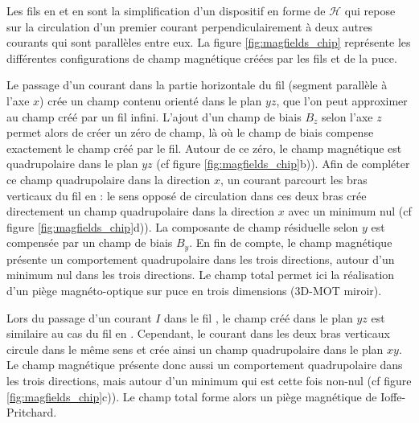 Les fils en  et en  sont la simplification d'un dispositif en forme de $\mathcal{H}$ qui repose sur la circulation d'un premier courant perpendiculairement à deux autres courants qui sont parallèles entre eux.
La figure \eqref{fig:magfields_chip} représente les différentes configurations de champ magnétique créées par les fils  et  de la puce.

Le passage d'un courant dans la partie horizontale du fil (segment parallèle à l'axe $x$) crée un champ contenu orienté dans le plan $yz$, que l'on peut approximer au champ créé par un fil infini.
L'ajout d'un champ de biais $B_z$ selon l'axe $z$ permet alors de créer un zéro de champ, là où le champ de biais compense exactement le champ créé par le fil.
Autour de ce zéro, le champ magnétique est quadrupolaire dans le plan $yz$ (cf figure \ref{fig:magfields_chip}b)).
Afin de compléter ce champ quadrupolaire dans la direction $x$, un courant parcourt les bras verticaux du fil en  : le sens opposé de circulation dans ces deux bras crée directement un champ quadrupolaire dans la direction $x$ avec un minimum nul (cf figure \ref{fig:magfields_chip}d)).
La composante de champ résiduelle selon $y$ est compensée par un champ de biais $B_y$.
En fin de compte, le champ magnétique présente un comportement quadrupolaire dans les trois directions, autour d'un minimum nul dans les trois directions.
Le champ total permet ici la réalisation d'un piège magnéto-optique sur puce en trois dimensions (\og 3D-MOT miroir\fg{}).

Lors du passage d'un courant $I$ dans le fil , le champ créé dans le plan $yz$ est similaire au cas du fil en .
Cependant, le courant dans les deux bras verticaux circule dans le même sens et crée ainsi un champ quadrupolaire dans le plan $xy$.
Le champ magnétique présente donc aussi un comportement quadrupolaire dans les trois directions, mais autour d'un minimum qui est cette fois non-nul (cf figure \ref{fig:magfields_chip}c)).
Le champ total forme alors un piège magnétique de Ioffe-Pritchard.

%


